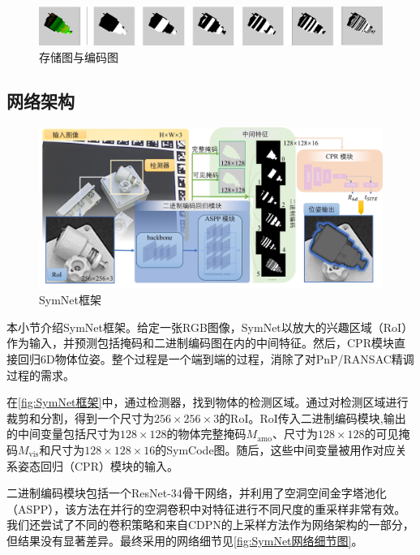 \begin{figure}[ht]
    \centerline{\includegraphics[width=1.0\textwidth]{figure/symnet/渲染与存储.jpg}}
    \caption{存储图与编码图}
    \label{fig:渲染与存储}
\end{figure}

\subsection{网络架构}
\begin{figure}[t]
    \centerline{\includegraphics[width=1.0\textwidth]{figure/symnet/network.jpg}}
    \caption{SymNet框架}
    \label{fig:SymNet框架}
\end{figure}

本小节介绍SymNet框架。给定一张RGB图像，SymNet以放大的兴趣区域（RoI）作为输入，并预测包括掩码和二进制编码图在内的中间特征。然后，CPR模块直接回归6D物体位姿。整个过程是一个端到端的过程，消除了对PnP/RANSAC精调过程的需求。

在\autoref{fig:SymNet框架}中，通过检测器，找到物体的检测区域。通过对检测区域进行裁剪和分割，得到一个尺寸为$256 \times 256 \times 3$的RoI。RoI传入二进制编码模块,输出的中间变量包括尺寸为$128 \times 128$的物体完整掩码$M_{\text{amo}}$、尺寸为$128 \times 128$的可见掩码$M_\text{{vis}}$和尺寸为$128 \times 128 \times 16$的SymCode图。随后，这些中间变量被用作对应关系姿态回归（CPR）模块的输入。

二进制编码模块包括一个ResNet-34骨干网络\cite{he2016resnet}，并利用了空洞空间金字塔池化（ASPP）\cite{chen2017deeplabv3}，该方法在并行的空洞卷积中对特征进行不同尺度的重采样非常有效。我们还尝试了不同的卷积策略和来自CDPN\cite{li2019cdpn}的上采样方法作为网络架构的一部分，但结果没有显著差异。最终采用的网络细节见\autoref{fig:SymNet网络细节图}。

